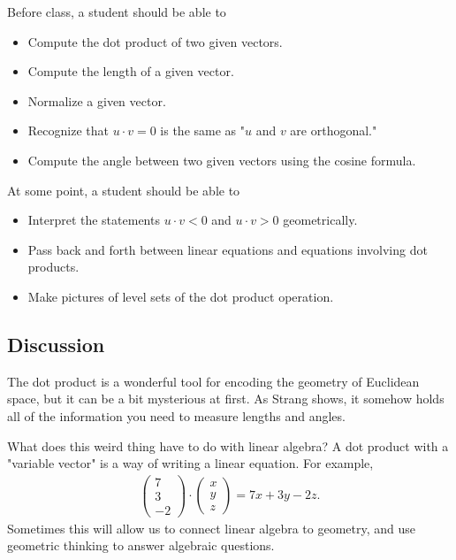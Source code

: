 \documentclass[10pt,]{book}
\theoremstyle{plain}
\theoremstyle{definition}
\numberwithin{equation}{section}
\begin{document}
      Before class, a student should be able to
      \begin{itemize}
\item{}Compute the dot product of two given vectors.\item{}Compute the length of a given vector.\item{}Normalize a given vector.\item{}Recognize that \(u \cdot v =0\) is the same as "\(u\) and \(
            v\) are orthogonal."\item{}
          Compute the angle between two given vectors using the cosine formula.
        \end{itemize}

      At some point, a student should be able to
      \begin{itemize}
\item{}
          Interpret the statements \(u\cdot v < 0 \) and \(u \cdot v > 0\)
          geometrically.
        \item{}Pass back and forth between linear equations and equations involving
          dot products.
        \item{}Make pictures of level sets of the dot product operation.\end{itemize}

\typeout{************************************************}
\typeout{************************************************}
\subsection[Discussion]{Discussion}\label{subsection-7}

      The dot product is a wonderful tool for encoding the geometry of Euclidean
      space, but it can be a bit mysterious at first. As Strang shows,
      it somehow holds all of the information you need to measure lengths and
      angles.
\par

      What does this weird thing have to do with linear algebra? A dot product
      with a "variable vector" is a way of writing a linear equation. For example,
      \begin{gather*}
\begin{pmatrix} 7 \\ 3 \\ -2 \end{pmatrix} \cdot \begin{pmatrix}
        x \\ y \\ z \end{pmatrix} = 7x+3y-2z.
\end{gather*}
      Sometimes this will allow us to connect linear algebra to geometry, and use
      geometric thinking to answer algebraic questions.
\typeout{************************************************}
\typeout{************************************************}
\end{document}

